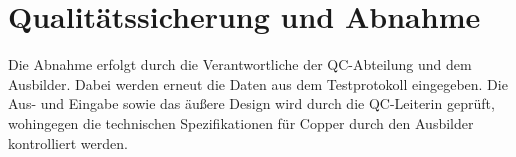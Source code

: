\section{Qualitätssicherung und Abnahme} 
\label{sec:QualitätssicherungAbnahme}
Die Abnahme erfolgt durch die Verantwortliche der \ac{QC}-Abteilung und dem Ausbilder. Dabei werden erneut die Daten aus dem Testprotokoll eingegeben. Die Aus- und Eingabe sowie das äußere Design wird durch die \ac{QC}-Leiterin geprüft, wohingegen die technischen Spezifikationen für Copper durch den Ausbilder kontrolliert werden.

